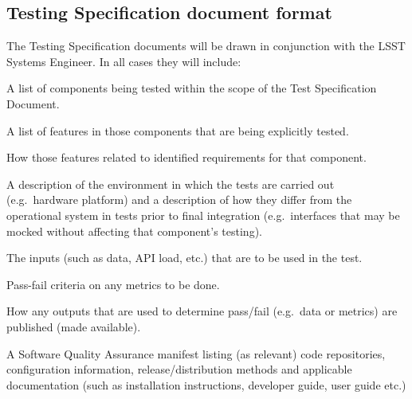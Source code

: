 \subsection{Testing Specification document format}\label{sect:tsform}

The Testing Specification documents will be drawn in conjunction with the LSST Systems Engineer. In all cases they will include:

\begin{itemize_single}

\item A list of components being tested within the scope of the Test Specification Document.

\item A list of features in those components that are being explicitly tested.

\item How those features related to identified requirements for that component.

\item A description of the environment in which the tests are carried out (e.g.\ hardware platform) and a description of how they differ from the operational system in tests prior to final integration (e.g.\ interfaces that may be mocked without affecting that component's testing).

\item The inputs (such as data, API load, etc.) that are to be used in the test.

\item Pass-fail criteria on any metrics to be done.

\item How any outputs that are used to determine pass/fail (e.g.\ data or metrics) are published (made available).

\item A Software Quality Assurance manifest listing (as relevant) code repositories, configuration information, release/distribution methods and applicable documentation (such as installation instructions, developer guide, user guide etc.)

\end{itemize_single}
